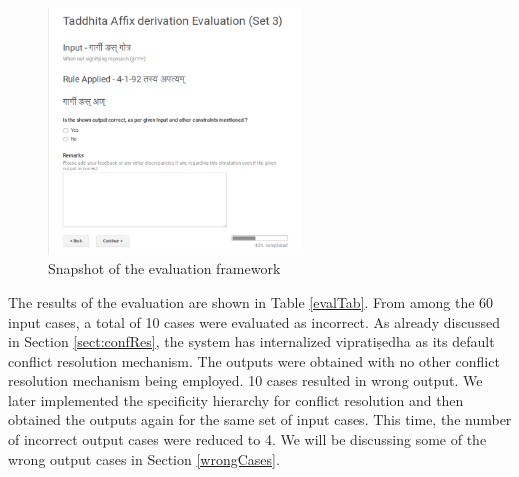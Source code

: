 \documentclass[11pt]{article}
\begin{document}
\begin{figure}[h]
    \centering
	\includegraphics[width=0.6\textwidth]{evalPic}
    \caption{Snapshot of the evaluation framework}
    \label{evalFig}
\end{figure}


The results of the evaluation are shown in Table \ref{evalTab}. From among the 60 input cases, a total of 10 cases were evaluated as incorrect. As already discussed in Section \ref{sect:confRes}, the system has internalized vipratiṣedha as its default conflict resolution mechanism. The outputs were obtained with no other conflict resolution mechanism being employed. 10 cases resulted in wrong output. We later implemented the specificity hierarchy for conflict resolution and then obtained the outputs again for the same set of input cases. This time, the number of incorrect output cases were reduced to 4. We will be discussing some of the wrong output cases in Section \ref{wrongCases}.  
\end{document}
